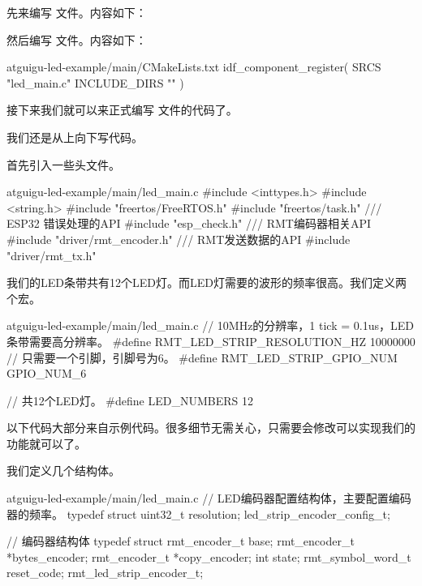 \documentclass[lang=cn,newtx,10pt,scheme=chinese]{elegantbook}
\begin{document}
先来编写  文件。内容如下：


然后编写  文件。内容如下：

\begin{mycode}{atguigu-led-example/main/CMakeLists.txt}
idf_component_register(
    SRCS "led_main.c"
    INCLUDE_DIRS ""
)
\end{mycode}

接下来我们就可以来正式编写  文件的代码了。

我们还是从上向下写代码。

首先引入一些头文件。

\begin{mycode}{atguigu-led-example/main/led\_main.c}
#include <inttypes.h>
#include <string.h>
#include "freertos/FreeRTOS.h"
#include "freertos/task.h"
/// ESP32 错误处理的API
#include "esp_check.h"
/// RMT编码器相关API
#include "driver/rmt_encoder.h"
/// RMT发送数据的API
#include "driver/rmt_tx.h"
\end{mycode}

我们的LED条带共有12个LED灯。而LED灯需要的波形的频率很高。我们定义两个宏。

\begin{mycode}{atguigu-led-example/main/led\_main.c}
// 10MHz的分辨率，1 tick = 0.1us，LED条带需要高分辨率。
#define RMT_LED_STRIP_RESOLUTION_HZ 10000000
// 只需要一个引脚，引脚号为6。
#define RMT_LED_STRIP_GPIO_NUM GPIO_NUM_6

// 共12个LED灯。
#define LED_NUMBERS 12
\end{mycode}

以下代码大部分来自示例代码。很多细节无需关心，只需要会修改可以实现我们的功能就可以了。

我们定义几个结构体。

\begin{mycode}{atguigu-led-example/main/led\_main.c}
// LED编码器配置结构体，主要配置编码器的频率。
typedef struct
{
    uint32_t resolution;
} led_strip_encoder_config_t;

// 编码器结构体
typedef struct
{
    rmt_encoder_t base;
    rmt_encoder_t *bytes_encoder;
    rmt_encoder_t *copy_encoder;
    int state;
    rmt_symbol_word_t reset_code;
} rmt_led_strip_encoder_t;
\end{mycode}
\end{document}
